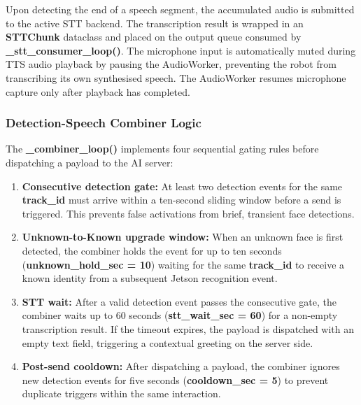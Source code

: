 Upon detecting the end of a speech segment, the accumulated audio is submitted to the active STT backend. The transcription result is wrapped in an \textbf{STTChunk} dataclass and placed on the output queue consumed by \textbf{\_stt\_consumer\_loop()}. The microphone input is automatically muted during TTS audio playback by pausing the AudioWorker, preventing the robot from transcribing its own synthesised speech. The AudioWorker resumes microphone capture only after playback has completed.

\subsubsection{Detection-Speech Combiner Logic}

The \textbf{\_combiner\_loop()} implements four sequential gating rules before dispatching a payload to the AI server:

\begin{enumerate}
    \item \textbf{Consecutive detection gate:} At least two detection events for the same \textbf{track\_id} must arrive within a ten-second sliding window before a send is triggered. This prevents false activations from brief, transient face detections.

    \item \textbf{Unknown-to-Known upgrade window:} When an unknown face is first detected, the combiner holds the event for up to ten seconds (\textbf{unknown\_hold\_sec = 10}) waiting for the same \textbf{track\_id} to receive a known identity from a subsequent Jetson recognition event.

    \item \textbf{STT wait:} After a valid detection event passes the consecutive gate, the combiner waits up to 60 seconds (\textbf{stt\_wait\_sec = 60}) for a non-empty transcription result. If the timeout expires, the payload is dispatched with an empty text field, triggering a contextual greeting on the server side.

    \item \textbf{Post-send cooldown:} After dispatching a payload, the combiner ignores new detection events for five seconds (\textbf{cooldown\_sec = 5}) to prevent duplicate triggers within the same interaction.
\end{enumerate}

